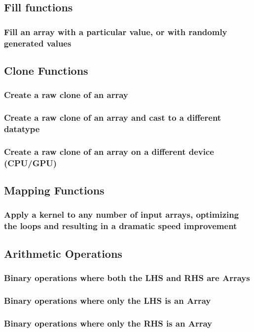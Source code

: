 \documentclass[10pt,a4paper]{report}
\begin{document}
		\subsection{Fill functions}
			\subsubsection{Fill an array with a particular value, or with randomly generated values}
		\subsection{Clone Functions}
			\subsubsection{Create a raw clone of an array}
			\subsubsection{Create a raw clone of an array and cast to a different datatype}
			\subsubsection{Create a raw clone of an array on a different device (CPU/GPU)}
		\subsection{Mapping Functions}
			\subsubsection{Apply a kernel to any number of input arrays, optimizing the loops and resulting in a dramatic speed improvement}
		\subsection{Arithmetic Operations}
			\subsubsection{Binary operations where both the LHS and RHS are Arrays}
			\subsubsection{Binary operations where only the LHS is an Array}
			\subsubsection{Binary operations where only the RHS is an Array}
\end{document}
